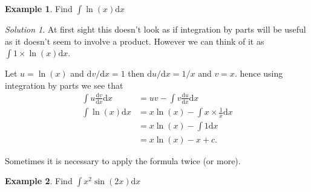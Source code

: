 \documentclass[
  11pt,
  oneside]{book}
\newcommand{\slide}{}
\theoremstyle{definition}
\theoremstyle{definition}
\newtheorem{example}{Example}[chapter]
\theoremstyle{definition}
\theoremstyle{definition}
\theoremstyle{remark}
\newtheorem*{solution}{Solution}
\begin{document}
\slide

\begin{example}
Find \(\displaystyle\int \ln(x)\mathrm{d}x\)
\end{example}

\begin{solution}
At first sight this doesn't look as if integration by parts will be useful as it doesn't seem to involve a product. However we can think of it as \(\displaystyle\int 1\times\ln(x)\mathrm{d}x\).

Let \(u = \ln(x)\) and \(\mathrm{d}v/\mathrm{d}x = 1\) then \(\mathrm{d}u/\mathrm{d}x = 1/x\) and \(v = x\). hence using integration by parts we see that
\begin{align*}
\int u\frac{\mathrm{d}v}{\mathrm{d}x}\mathrm{d}x& = uv-\int v\frac{\mathrm{d}u}{\mathrm{d}x}\mathrm{d}x\\
\int\ln(x)\mathrm{d}x&=x\ln(x)-\int x\times\frac 1x \mathrm{d}x\\
&=x\ln(x)-\int 1\mathrm{d}x\\
&=x\ln(x)-x + c.
\end{align*}
\end{solution}

\slide

Sometimes it is necessary to apply the formula twice (or more).

\begin{example}
Find \(\displaystyle\int x^2\sin(2x)\mathrm{d}x\)
\end{example}
\end{document}

